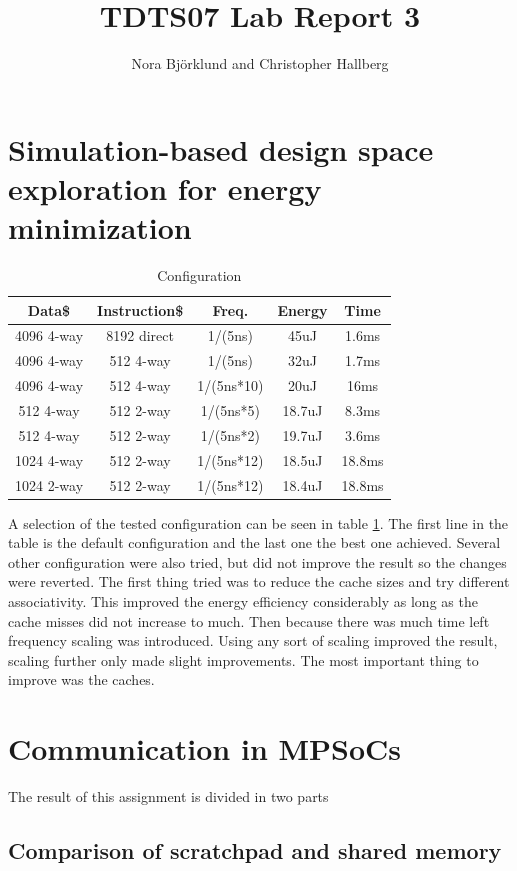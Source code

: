 \documentclass[a4paper, 12pt]{article}
\title{TDTS07 Lab Report 3}
\author{Nora Björklund and Christopher Hallberg}
\begin{document}
\maketitle


\section{Simulation-based design space exploration for energy minimization}

\begin{table}[h]
  \centering
  \begin{tabular}{c c c c c}
    \hline
    Data\$ & Instruction\$ & Freq. & Energy & Time \\
    \hline
    4096 4-way & 8192 direct & 1/(5ns) & 45uJ & 1.6ms \\
    4096 4-way & 512 4-way & 1/(5ns) & 32uJ & 1.7ms \\
    4096 4-way & 512 4-way & 1/(5ns*10) & 20uJ & 16ms \\
    512 4-way & 512 2-way & 1/(5ns*5) & 18.7uJ & 8.3ms \\
    512 4-way & 512 2-way & 1/(5ns*2) & 19.7uJ & 3.6ms \\
    1024 4-way & 512 2-way & 1/(5ns*12) & 18.5uJ & 18.8ms \\
    \hline
    1024 2-way & 512 2-way & 1/(5ns*12) & 18.4uJ & 18.8ms \\
  \end{tabular}
  \caption{Configuration}
  \label{fig:conf}
\end{table}
A selection of the tested configuration can be seen in table \ref{fig:conf}.
The first line in the table is the default configuration and the last one the
best one achieved. Several other configuration were also tried, but did not
improve the result so the changes were reverted. The first thing tried was to
reduce the cache sizes and try different associativity. This improved the energy
efficiency considerably as long as the cache misses did not increase to much.
Then because there was much time left frequency scaling was introduced. Using
any sort of scaling improved the result, scaling further only made slight
improvements. The most important thing to improve was the caches. 

\section{Communication in MPSoCs}
The result of this assignment is divided in two parts
\subsection{Comparison of scratchpad and shared memory}
\end{document}
